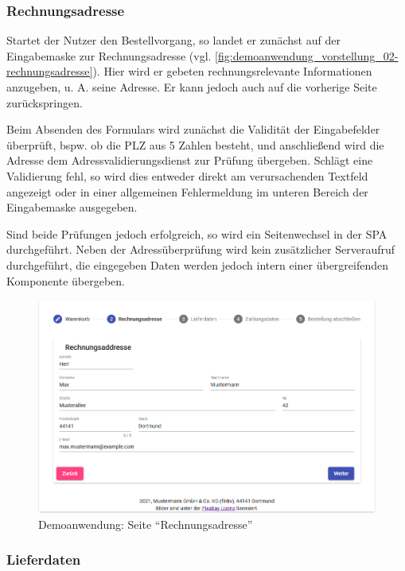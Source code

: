 \subsubsection{Rechnungsadresse}

Startet der Nutzer den Bestellvorgang, so landet er zunächst auf der Eingabemaske zur Rechnungsadresse (vgl. \autoref{fig:demoanwendung_vorstellung_02-rechnungsadresse}). Hier wird er gebeten rechnungsrelevante Informationen anzugeben, u. A. seine Adresse. Er kann jedoch auch auf die vorherige Seite zurückspringen.

Beim Absenden des Formulars wird zunächst die Validität der Eingabefelder überprüft, bspw. ob die PLZ aus 5 Zahlen besteht, und anschließend wird die Adresse dem Adressvalidierungsdienst zur Prüfung übergeben. Schlägt eine Validierung fehl, so wird dies entweder direkt am verursachenden Textfeld angezeigt oder in einer allgemeinen Fehlermeldung im unteren Bereich der Eingabemaske ausgegeben.

Sind beide Prüfungen jedoch erfolgreich, so wird ein Seitenwechsel in der SPA durchgeführt. Neben der Adressüberprüfung wird kein zusätzlicher Serveraufruf durchgeführt, die eingegeben Daten werden jedoch intern einer übergreifenden Komponente übergeben.

\begin{figure}[H]
	\centering
	\includegraphics[width=1.00\linewidth]{img/04_erstellung-poc/demoanwendung_vorstellung_02-rechnungsadresse.png}
	\caption{Demoanwendung: Seite \enquote{Rechnungsadresse}}
	\label{fig:demoanwendung_vorstellung_02-rechnungsadresse}
\end{figure}

\newpage

\subsubsection{Lieferdaten}

